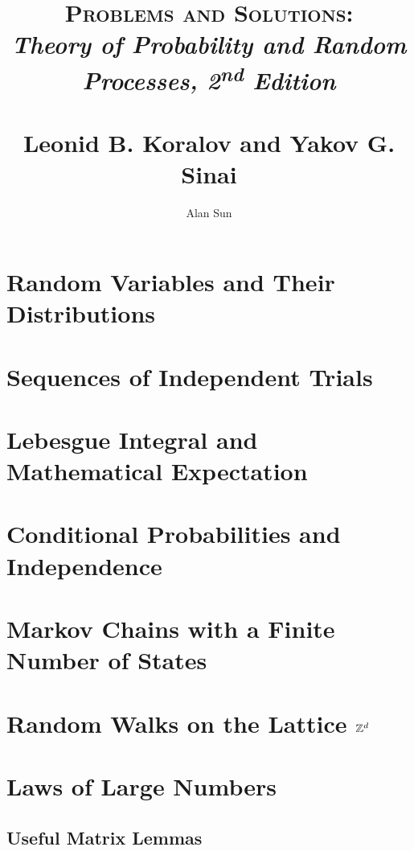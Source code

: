 \documentclass{report}
\title{\textsc{Problems and Solutions:} \\ 
\textit{Theory of Probability and Random Processes, 2\textsuperscript{nd} Edition} \\ 
~\\ \large Leonid B. Koralov and Yakov G. Sinai}
\author{Alan Sun}
\date{}
\begin{document}
\maketitle

\tableofcontents
\chapter{Random Variables and Their Distributions}

\chapter{Sequences of Independent Trials}

\chapter{Lebesgue Integral and Mathematical Expectation}

\chapter{Conditional Probabilities and Independence}


\chapter{Markov Chains with a Finite Number of States}


\chapter{Random Walks on the Lattice $\mathbb{Z}^d$}


\chapter{Laws of Large Numbers}




\begin{appendices}
\chapter{Useful Matrix Lemmas}

\end{appendices}
\end{document}
